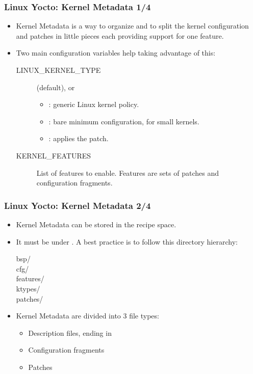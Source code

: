 \begin{frame}
  \frametitle{Linux Yocto: Kernel Metadata 1/4}
  \begin{itemize}
    \item Kernel Metadata is a way to organize and to split the
      kernel configuration and patches in little pieces each providing
      support for one feature.
    \item Two main configuration variables help taking advantage of
      this:
      \begin{description}
        \item[LINUX\_KERNEL\_TYPE]  (default),
           or 
          \begin{itemize}
            \item {}: generic Linux kernel policy.
            \item {}: bare minimum configuration, for small
              kernels.
            \item {}: applies the 
              patch.
          \end{itemize}
        \item[KERNEL\_FEATURES] List of features to enable. Features
          are sets of patches and configuration fragments.
      \end{description}
  \end{itemize}
\end{frame}

\begin{frame}
  \frametitle{Linux Yocto: Kernel Metadata 2/4}
  \begin{itemize}
    \item Kernel Metadata can be stored in the 
      recipe space.
    \item It must be under . A best practice
      is to follow this directory hierarchy:
      \begin{description}
        \item[bsp/]
        \item[cfg/]
        \item[features/]
        \item[ktypes/]
        \item[patches/]
      \end{description}
    \item Kernel Metadata are divided into 3 file types:
      \begin{itemize}
        \item Description files, ending in 
        \item Configuration fragments
        \item Patches
      \end{itemize}
  \end{itemize}
\end{frame}

